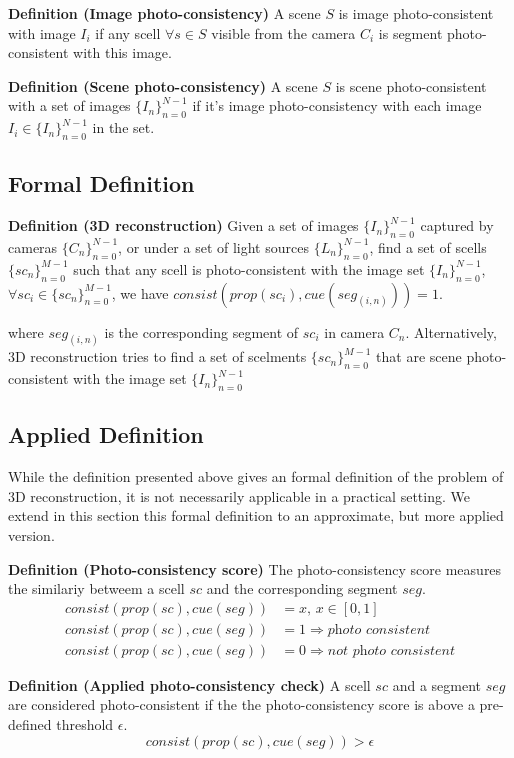 \textbf{Definition (Image photo-consistency)} A scene $S$ is image photo-consistent with image $I_i$ if any scell $\forall s\in S$ visible from the camera $C_i$ is segment photo-consistent with this image.

\textbf{Definition (Scene photo-consistency)} A scene $S$ is scene photo-consistent with a set of images $\{I_n\}_{n=0}^{N-1}$ if it's image photo-consistency with each image $I_i\in \{I_n\}_{n=0}^{N-1}$ in the set.

\subsection{Formal Definition}
\textbf{Definition (3D reconstruction)} Given a set of images $\{I_n\}_{n=0}^{N-1}$ captured by cameras $\{C_n\}_{n=0}^{N-1}$, or under a set of light sources $\{L_n\}_{n=0}^{N-1}$, find a set of scells $\{sc_n\}_{n=0}^{M-1}$ such that any scell is photo-consistent with the image set $\{I_n\}_{n=0}^{N-1}$, \ie $\forall sc_i\in \{sc_n\}_{n=0}^{M-1}$, we have $consist(prop(sc_i), cue(seg_{(i, n)})) = 1$.

where $seg_{(i, n)}$ is the corresponding segment of $sc_i$ in camera $C_n$. Alternatively, 3D reconstruction tries to find a set of scelments $\{sc_n\}_{n=0}^{M-1}$ that are scene photo-consistent with the image set $\{I_n\}_{n=0}^{N-1}$

\subsection{Applied Definition}
While the definition presented above gives an formal definition of the problem of 3D reconstruction, it is not necessarily applicable in a practical setting. We extend in this section this formal definition to an approximate, but more applied version.

\textbf{Definition (Photo-consistency score)} The photo-consistency score measures the similariy betweem a scell $sc$ and the corresponding segment $seg$.
\begin{align*}
consist(prop(sc), cue(seg)) &= x \text{, } x\in[0, 1]\\
consist(prop(sc), cue(seg)) &= 1 \Rightarrow \textit{photo consistent}\\
consist(prop(sc), cue(seg)) &= 0 \Rightarrow \textit{not photo consistent}
\end{align*}

\textbf{Definition (Applied photo-consistency check)} A scell $sc$ and a segment $seg$ are considered photo-consistent if the the photo-consistency score is above a pre-defined threshold $\epsilon$.
$$
consist(prop(sc), cue(seg)) > \epsilon
$$

